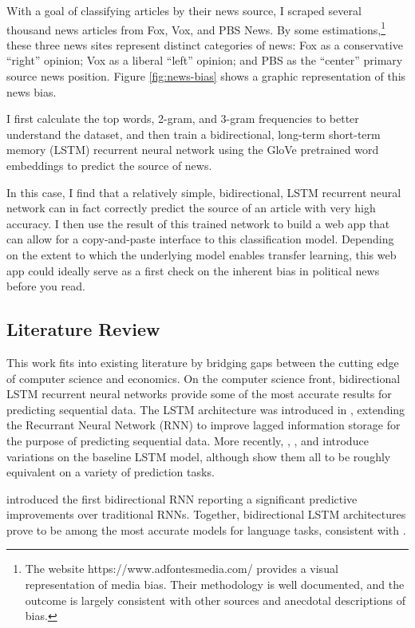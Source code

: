 \documentclass{article}
\begin{document}
		With a goal of classifying articles by their news source, I scraped several thousand news articles from Fox, Vox, and PBS News. By some estimations,\footnote{The website https://www.adfontesmedia.com/ provides a visual representation of media bias. Their methodology is well documented, and the outcome is largely consistent with other sources and anecdotal descriptions of bias.} these three news sites represent distinct categories of news: Fox as a conservative “right” opinion; Vox as a liberal “left” opinion; and PBS as the “center” primary source news position. Figure \ref{fig:news-bias} shows a graphic representation of this news bias. 
		
		I first calculate the top words, 2-gram, and 3-gram frequencies to better understand the dataset, and then train a bidirectional, long-term short-term memory (LSTM) recurrent neural network using the GloVe pretrained word embeddings to predict the source of news. 
		
		In this case, I find that a relatively simple, bidirectional, LSTM recurrent neural network can in fact correctly predict the source of an article with very high accuracy. I then use the result of this trained network to build a web app that can allow for a copy-and-paste interface to this classification model. Depending on the extent to which the underlying model enables transfer learning, this web app could ideally serve as a first check on the inherent bias in political news before you read. 
		
		\subsection{Literature Review}
		
		This work fits into existing literature by bridging gaps between the cutting edge of computer science and economics. On the computer science front, bidirectional LSTM recurrent neural networks provide some of the most accurate results for predicting sequential data. The LSTM architecture was introduced in \citet{hochreiter1997long}, extending the Recurrant Neural Network (RNN) to improve lagged information storage for the purpose of predicting sequential data. More recently, \citet{gers2000recurrent}, \citet{chung2014empirical}, and \citet{yao2015depth} introduce variations on the baseline \citet{hochreiter1997long} LSTM model, although \citet{greff2016lstm} show them all to be roughly equivalent on a variety of prediction tasks. 
		
		\citet{schuster1997bidirectional} introduced the first bidirectional RNN reporting a significant predictive improvements over traditional RNNs. Together, bidirectional LSTM architectures prove to be among the most accurate models for language tasks, consistent with \citet{wang2015unified}. 
		
\end{document}
